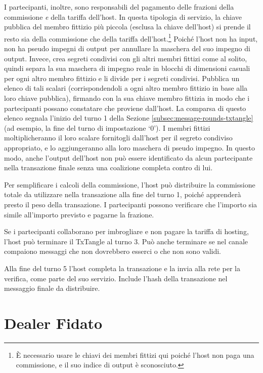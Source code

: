 I partecipanti, inoltre, sono responsabili del pagamento delle frazioni della commissione \emph{e} della tariffa dell'host. In questa tipologia di servizio, la chiave pubblica del membro fittizio più piccola (esclusa la chiave dell'host) si prende il resto sia della commissione che della tariffa dell'host.\footnote{È necessario usare le chiavi dei membri fittizi qui poiché l'host non paga una commissione, e il suo indice di output è sconosciuto.} Poiché l'host non ha input, non ha pseudo impegni di output per annullare la maschera del suo impegno di output. Invece, crea segreti condivisi con gli altri membri fittizi come al solito, quindi separa la sua maschera di impegno reale in blocchi di dimensioni casuali per ogni altro membro fittizio e li divide per i segreti condivisi. Pubblica un elenco di tali scalari (corrispondendoli a ogni altro membro fittizio in base alla loro chiave pubblica), firmando con la sua chiave membro fittizia in modo che i partecipanti possano constatare che proviene dall'host. La comparsa di questo elenco segnala l'inizio del turno 1 della Sezione \ref{subsec:message-rounds-txtangle} (ad esempio, la fine del turno di impostazione `0'). I membri fittizi moltiplicheranno il loro scalare fornitogli dall'host per il segreto condiviso appropriato, e lo aggiungeranno alla loro maschera di pseudo impegno. In questo modo, anche l'output dell'host non può essere identificato da alcun partecipante nella transazione finale senza una coalizione completa contro di lui.

Per semplificare i calcoli della commissione, l'host può distribuire la commissione totale da utilizzare nella transazione alla fine del turno 1, poiché apprenderà presto il peso della transazione. I partecipanti possono verificare che l'importo sia simile all'importo previsto e pagarne la frazione.

Se i partecipanti collaborano per imbrogliare e non pagare la tariffa di hosting, l'host può terminare il TxTangle al turno 3. Può anche terminare se nel canale compaiono messaggi che non dovrebbero esserci o che non sono validi.

Alla fine del turno 5 l'host completa la transazione e la invia alla rete per la verifica, come parte del suo servizio. Include l'hash della transazione nel messaggio finale da distribuire.



\section{Dealer Fidato}
\label{sec:dealer-txtangle}

